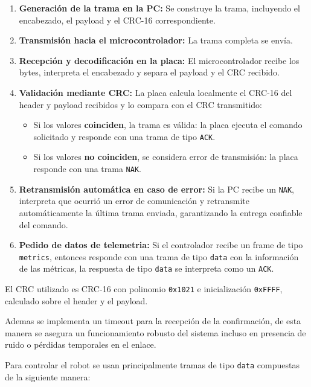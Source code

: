 \begin{enumerate}
    \item \textbf{Generación de la trama en la PC:}  
    Se construye la trama, incluyendo el encabezado, el payload y el CRC-16 correspondiente.

    \item \textbf{Transmisión hacia el microcontrolador:}  
    La trama completa se envía.

    \item \textbf{Recepción y decodificación en la placa:}  
    El microcontrolador recibe los bytes, interpreta el encabezado y separa el payload y el CRC recibido.

    \item \textbf{Validación mediante CRC:}  
    La placa calcula localmente el CRC-16 del header y payload recibidos y lo compara con el CRC transmitido:
    \begin{itemize}
        \item Si los valores \textbf{coinciden}, la trama es válida:  
        la placa ejecuta el comando solicitado y responde con una trama de tipo \texttt{ACK}.
        \item Si los valores \textbf{no coinciden}, se considera error de transmisión:  
        la placa responde con una trama \texttt{NAK}.
    \end{itemize}

    \item \textbf{Retransmisión automática en caso de error:}  
    Si la PC recibe un \texttt{NAK}, interpreta que ocurrió un error de comunicación y retransmite automáticamente la última trama enviada, garantizando la entrega confiable del comando.

    \item \textbf{Pedido de datos de telemetria:}  
    Si el controlador recibe un frame de tipo \texttt{metrics}, entonces responde con una trama de tipo \texttt{data} con la información de las métricas, la respuesta de tipo \texttt{data} se interpreta como un \texttt{ACK}.
\end{enumerate}
El CRC utilizado es CRC-16 con polinomio \texttt{0x1021} e inicialización \texttt{0xFFFF}, calculado sobre el header y el payload. 

Ademas se implementa un timeout para la recepción de la confirmación, de esta manera se asegura un funcionamiento robusto del sistema incluso en presencia de ruido o pérdidas temporales en el enlace.


Para controlar el robot se usan principalmente tramas de tipo \texttt{data} compuestas de la siguiente manera:


